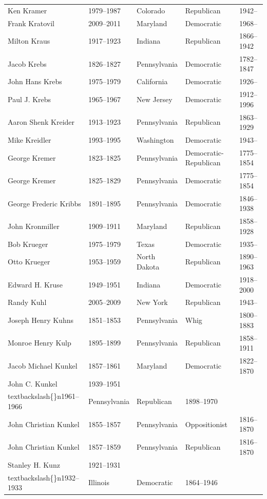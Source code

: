 \documentclass{article}
\begin{document}
\begin{tabular}{lllll}
Ken Kramer & 1979–1987 & Colorado & Republican & 1942– \\
Frank Kratovil & 2009–2011 & Maryland & Democratic & 1968– \\
Milton Kraus & 1917–1923 & Indiana & Republican & 1866–1942 \\
Jacob Krebs & 1826–1827 & Pennsylvania & Democratic & 1782–1847 \\
John Hans Krebs & 1975–1979 & California & Democratic & 1926– \\
Paul J. Krebs & 1965–1967 & New Jersey & Democratic & 1912–1996 \\
Aaron Shenk Kreider & 1913–1923 & Pennsylvania & Republican & 1863–1929 \\
Mike Kreidler & 1993–1995 & Washington & Democratic & 1943– \\
George Kremer & 1823–1825 & Pennsylvania & Democratic-Republican & 1775–1854 \\
George Kremer & 1825–1829 & Pennsylvania & Democratic & 1775–1854 \\
George Frederic Kribbs & 1891–1895 & Pennsylvania & Democratic & 1846–1938 \\
John Kronmiller & 1909–1911 & Maryland & Republican & 1858–1928 \\
Bob Krueger & 1975–1979 & Texas & Democratic & 1935– \\
Otto Krueger & 1953–1959 & North Dakota & Republican & 1890–1963 \\
Edward H. Kruse & 1949–1951 & Indiana & Democratic & 1918–2000 \\
Randy Kuhl & 2005–2009 & New York & Republican & 1943– \\
Joseph Henry Kuhns & 1851–1853 & Pennsylvania & Whig & 1800–1883 \\
Monroe Henry Kulp & 1895–1899 & Pennsylvania & Republican & 1858–1911 \\
Jacob Michael Kunkel & 1857–1861 & Maryland & Democratic & 1822–1870 \\
John C. Kunkel & 1939–1951\\textbackslash\{\}n1961–1966 & Pennsylvania & Republican & 1898–1970 \\
John Christian Kunkel & 1855–1857 & Pennsylvania & Oppositionist & 1816–1870 \\
John Christian Kunkel & 1857–1859 & Pennsylvania & Republican & 1816–1870 \\
Stanley H. Kunz & 1921–1931\\textbackslash\{\}n1932–1933 & Illinois & Democratic & 1864–1946 \\

\end{tabular}
\end{document}
